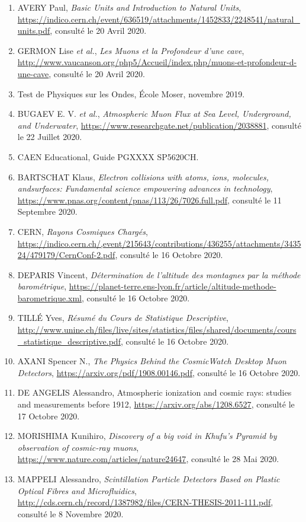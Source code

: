 \documentclass[a4paper, 12pt]{article}
\begin{document}
\begin{spacing}{1.5}
\begin{enumerate}
  \item AVERY Paul, \emph{Basic Units and Introduction to Natural Units}, \url{https://indico.cern.ch/event/636519/attachments/1452833/2248541/natural_units.pdf}, consulté le 20 Avril 2020.
  \item GERMON Lise \emph{et al.}, \emph{Les Muons et la Profondeur d'une cave}, \url{http://www.vaucanson.org/php5/Accueil/index.php/muons-et-profondeur-d-une-cave}, consulté le 20 Avril 2020.
  \item Test de Physiques sur les Ondes, École Moser, novembre 2019.
  \item BUGAEV E. V. \emph{et al.}, \emph{Atmospheric Muon Flux at Sea Level, Underground, and Underwater}, \url{https://www.researchgate.net/publication/2038881}, consulté le 22 Juillet 2020.
  \item CAEN Educational, Guide PGXXXX SP5620CH.
  \item BARTSCHAT Klaus, \emph{Electron collisions with atoms, ions, molecules, andsurfaces: Fundamental science empowering advances in technology}, \url{https://www.pnas.org/content/pnas/113/26/7026.full.pdf}, consulté le 11 Septembre 2020.
  \item CERN, \emph{Rayons Cosmiques Chargés}, \url{https://indico.cern.ch/,event/215643/contributions/436255/attachments/343524/479179/CernConf-2.pdf}, consulté le 16 Octobre 2020.
  \item DEPARIS Vincent, \emph{Détermination de l'altitude des montagnes par la méthode barométrique}, \url{https://planet-terre.ens-lyon.fr/article/altitude-methode-barometrique.xml}, consulté le 16 Octobre 2020.
  \item TILLÉ Yves, \emph{Résumé du Cours de Statistique Descriptive}, \url{http://www.unine.ch/files/live/sites/statistics/files/shared/documents/cours_statistique_descriptive.pdf}, consulté le 16 Octobre 2020.
  \item AXANI Spencer N., \emph{The Physics Behind the CosmicWatch Desktop Muon Detectors}, \url{https://arxiv.org/pdf/1908.00146.pdf}, consulté le 16 Octobre 2020.
  \item DE ANGELIS Alessandro, Atmospheric ionization and cosmic rays: studies and measurements before 1912, \url{https://arxiv.org/abs/1208.6527}, consulté le 17 Octobre 2020.
  \item MORISHIMA Kunihiro, \emph{Discovery of a big void in Khufu’s Pyramid by observation of cosmic-ray muons}, \url{https://www.nature.com/articles/nature24647}, consulté le 28 Mai 2020.
  \item MAPPELI Alessandro, \emph{Scintillation Particle Detectors Based on Plastic Optical Fibres and Microfluidics}, \url{http://cds.cern.ch/record/1387982/files/CERN-THESIS-2011-111.pdf}, consulté le 8 Novembre 2020.


\end{enumerate}
\end{spacing}
\end{document}
